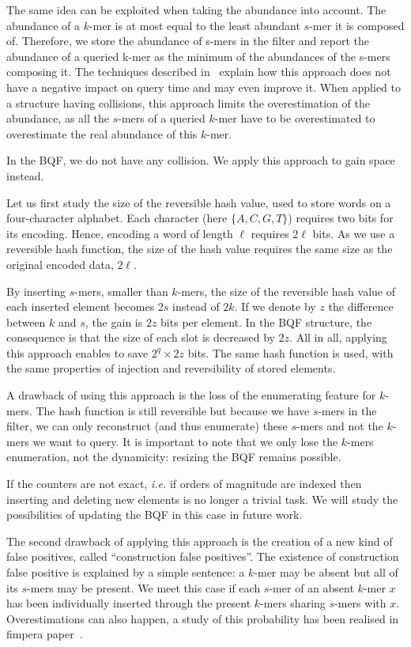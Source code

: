 The same idea can be exploited when taking the abundance into account. The abundance of a $k$-mer is at most equal to the least abundant $s$-mer it is composed of. Therefore, we store the abundance of s-mers in the filter and report the abundance of a queried k-mer as the minimum of the abundances of the s-mers composing it. The techniques described in~\cite{fimpera_2023} explain how this approach does not have a negative impact on query time and may even improve it.
When applied to a structure having collisions, this approach limits the overestimation of the abundance, as all the $s$-mers of a queried $k$-mer have to be overestimated to overestimate the real abundance of this $k$-mer. 

In the BQF, we do not have any collision. We apply this approach to gain space instead.

Let us first study the size of the reversible hash value, used to store words on a four-character alphabet. Each character (here $\{A,C,G,T\}$) requires two bits for its encoding. Hence, encoding a word of length $\ell$ requires $2\ell$ bits. As we use a reversible hash function, the size of the hash value requires the same size as the original encoded data, $2\ell$. 

By inserting $s$-mers, smaller than $k$-mers, the size of the reversible hash value of each inserted element becomes $2s$ instead of $2k$. If we denote by $z$ the difference between $k$ and $s$, the gain is $2z$ bits per element. In the BQF structure, the consequence is that the size of each slot is decreased by $2z$. All in all, applying this approach enables to save $2^q \times 2z$ bits. The same hash function is used, with the same  properties of injection and reversibility of stored elements.

A drawback of using this approach is the loss of the enumerating feature for $k$-mers. The hash function is still reversible but because we have $s$-mers in the filter, we can only reconstruct (and thus enumerate) these $s$-mers and not the $k$-mers we want to query. It is important to note that we only lose the $k$-mers enumeration, not the dynamicity: resizing the BQF remains possible.

If the counters are not exact, \textit{i.e.} if orders of magnitude are indexed then inserting and deleting new elements is no longer a trivial task. We will study the possibilities of updating the BQF in this case in future work.

The second drawback of applying this approach is the creation of a new kind of false positives, called ``construction false positives''. 
The existence of construction false positive is explained by a simple sentence: a $k$-mer may be absent but all of its $s$-mers may be present. We meet this case if each $s$-mer of an absent $k$-mer $x$ has been individually inserted through the present $k$-mers sharing $s$-mers with $x$. 
Overestimations can also happen, a study of this probability has been realised in fimpera paper~\cite{fimpera_2023}.






